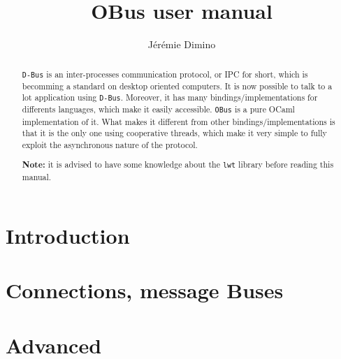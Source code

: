 \documentclass{article}
\title{OBus user manual}
\author{Jérémie Dimino}
\newcommand{\obus}{\texttt{OBus}\xspace}
\newcommand{\dbus}{\texttt{D-Bus}\xspace}
\begin{document}
\maketitle

\begin{abstract}
  \dbus is an inter-processes communication protocol, or IPC for
  short, which is becomming a standard on desktop oriented
  computers. It is now possible to talk to a lot application using
  \dbus. Moreover, it has many bindings/implementations for differents
  languages, which make it easily accessible. \obus is a pure OCaml
  implementation of it. What makes it different from other
  bindings/implementations is that it is the only one using
  cooperative threads, which make it very simple to fully exploit the
  asynchronous nature of the protocol.

  \textbf{Note:} it is advised to have some knowledge about the
  \texttt{lwt} library before reading this manual.
\end{abstract}


\setcounter{tocdepth}{2}
\tableofcontents

\section{Introduction}

\section{Connections, message Buses}



\section{Advanced}

\end{document}
